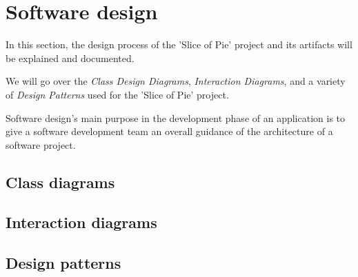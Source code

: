\section{Software design}
In this section, the design process of the 'Slice of Pie' project and its artifacts will be explained and documented.

We will go over the \emph{Class Design Diagrams}, \emph{Interaction Diagrams}, and a variety of \emph{Design Patterns} used for the 'Slice of Pie' project.

Software design's main purpose in the development phase of an application is to give a software development team an overall guidance of the architecture
of a software project.

\subsection{Class diagrams}


\subsection{Interaction diagrams}


\subsection{Design patterns}
